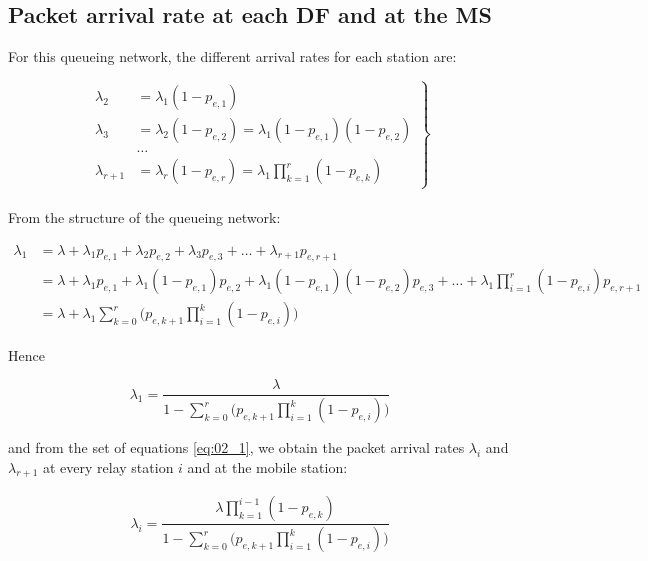 \subsection{Packet arrival rate at each DF and at the MS}

For this queueing network, the different arrival rates for each station are:

\begin{equation}
 \left.
  \begin{array}{rl}
    \lambda_2 &= \lambda_1 (1 - p_{e,1}) \\
    \lambda_3 &= \lambda_2 (1 - p_{e,2}) = \lambda_1 (1 - p_{e,1}) (1 - p_{e,2}) \\
    & \dots \\
    \lambda_{r+1} &= \lambda_r (1-p_{e,r}) = \lambda_1 \prod\limits_{k=1}^{r} (1 - p_{e,k})
  \end{array}
\right\} \label{eq:02_1}
\end{equation} \\

From the structure of the queueing network:

\begin{align*}
  \lambda_1 &= \lambda + \lambda_1 p_{e,1} + \lambda_2 p_{e,2} + \lambda_3 p_{e,3}
  + \dots
  + \lambda_{r+1} p_{e,r+1} \\
  ~ &= \lambda + \lambda_1 p_{e,1} + \lambda_1 (1 - p_{e,1}) p_{e,2}
  + \lambda_1 (1 - p_{e,1})(1 - p_{e,2}) p_{e,3}
  + \dots
  + \lambda_1 \prod\limits_{i=1}^r (1 - p_{e,i}) p_{e,r+1} \\
  ~ &= \lambda + \lambda_1 \sum_{k=0}^r \Big(p_{e,k+1} \prod\limits_{i=1}^k (1 - p_{e,i})\Big)
\end{align*}

Hence

\begin{equation*}
  \lambda_1 = \dfrac{\lambda}{1 - \sum\limits_{k=0}^r \Big(p_{e,k+1} \prod\limits_{i=1}^k (1 - p_{e,i})\Big)}
\end{equation*}

and from the set of equations \ref{eq:02_1}, we obtain the packet arrival rates
$\lambda_i$ and $\lambda_{r+1}$ at every relay station $i$ and at the mobile
station:

\begin{align}
  \lambda_i = \dfrac{\lambda \prod\limits_{k=1}^{i-1} (1 - p_{e,k})}{1 - \sum\limits_{k=0}^r \Big(p_{e,k+1} \prod\limits_{i=1}^k (1 - p_{e,i})\Big)}
  \label{eq:02_lambda_i}
\end{align}

